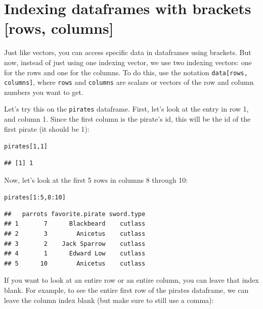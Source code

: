 \documentclass{tufte-book}\usepackage[]{graphicx}\usepackage[]{color}
\makeatletter
\newcommand{\hlnum}[1]{\textcolor[rgb]{0.686,0.059,0.569}{#1}}%
\newcommand{\hlopt}[1]{\textcolor[rgb]{0,0,0}{#1}}%
\newcommand{\hlstd}[1]{\textcolor[rgb]{0.345,0.345,0.345}{#1}}%
\newenvironment{kframe}{%
 \def\at@end@of@kframe{}%
 \ifinner\ifhmode%
  \def\at@end@of@kframe{\end{minipage}}%
  \begin{minipage}{\columnwidth}%
 \fi\fi%
 \def\FrameCommand##1{\hskip\@totalleftmargin \hskip-\fboxsep
 \colorbox{shadecolor}{##1}\hskip-\fboxsep
     \hskip-\linewidth \hskip-\@totalleftmargin \hskip\columnwidth}%
 \MakeFramed {\advance\hsize-\width
   \@totalleftmargin\z@ \linewidth\hsize
   \@setminipage}}%
 {\par\unskip\endMakeFramed%
 \at@end@of@kframe}
\newenvironment{knitrout}{}{} %
\makeatother
\begin{document}
\section{Indexing dataframes with brackets [rows, columns]}

Just like vectors, you can access specific data in dataframes using brackets. But now, instead of just using one indexing vector, we use two indexing vectors: one for the rows and one for the columns. To do this, use the notation \texttt{data[rows, columns]}, where \texttt{rows} and \texttt{columns} are scalars or vectors of the row and column numbers you want to get.

Let's try this on the \texttt{pirates} dataframe. First, let's look at the entry in row 1, and column 1. Since the first column is the pirate's id, this will be the id of the first pirate (it should be 1):

\begin{knitrout}
\color{fgcolor}\begin{kframe}
\begin{alltt}
\hlstd{pirates[}\hlnum{1}\hlstd{,} \hlnum{1}\hlstd{]}
\end{alltt}
\begin{verbatim}
## [1] 1
\end{verbatim}
\end{kframe}
\end{knitrout}

Now, let's look at the first 5 rows in columns 8 through 10:

\begin{knitrout}
\color{fgcolor}\begin{kframe}
\begin{alltt}
\hlstd{pirates[}\hlnum{1}\hlopt{:}\hlnum{5}\hlstd{,} \hlnum{8}\hlopt{:}\hlnum{10}\hlstd{]}
\end{alltt}
\begin{verbatim}
##   parrots favorite.pirate sword.type
## 1       7      Blackbeard    cutlass
## 2       3        Anicetus    cutlass
## 3       2    Jack Sparrow    cutlass
## 4       1      Edward Low    cutlass
## 5      10        Anicetus    cutlass
\end{verbatim}
\end{kframe}
\end{knitrout}

If you want to look at an entire row or an entire column, you can leave that index blank. For example, to see the entire first row of the pirates dataframe, we can leave the column index blank (but make sure to still use a comma):
\end{document}
